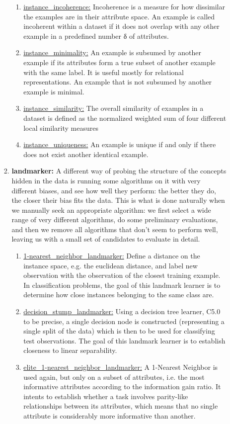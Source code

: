 \documentclass[a4paper,12pt, english]{article}
\begin{document}
\begin{enumerate}
\begin{enumerate}
\begin{enumerate}
\begin{enumerate}
				\item \underline{instance\_incoherence:} Incoherence is a measure for how dissimilar the examples are in their attribute space. An example is called incoherent within a dataset if it does not overlap with any other example in a predefined number δ of attributes.
				\item \underline{instance\_minimality:} An example is subsumed by another example if its attributes form a true subset of another example with the same label. It is useful mostly for relational representations. An example that is not subsumed by another example is minimal. 
				\item \underline{instance\_similarity:}  The overall similarity of examples in a dataset is defined as the normalized weighted sum of four different local similarity measures
				\item \underline{instance\_uniqueness:} An example is unique if and only if there does not exist another identical example.
				\end{enumerate}			
			\item \textbf{landmarker:} A different way of probing the structure of the concepts hidden in the data is running some algorithms on it with very different biases, and see how well they perform: the better they do, the closer their bias fits the data. This is what is done naturally when we manually seek an appropriate algorithm: we first select a wide range of very different algorithms, do some preliminary evaluations, and then we remove all algorithms that don’t seem to perform well, leaving us with a small set of candidates to evaluate in detail.
				\begin{enumerate}
				\item \underline{1-nearest\_neighbor\_landmarker:}  Define a distance on the instance space, e.g. the euclidean distance, and label new observation with the observation of the closest training example. In classification problems, the goal of this landmark learner is to determine how close instances belonging to the same class are.
				\item \underline{decision\_stump\_landmarker:} Using a decision tree learner, C5.0 to be precise, a single decision node is constructed (representing a single split of the data) which is then to be used for classifying test observations. The goal of this landmark learner is to establish closeness to linear separability.
				\item \underline{elite\_1-nearest\_neighbor\_landmarker:}  A 1-Nearest Neighbor is used again, but only on a subset of attributes, i.e. the most informative attributes according to the information gain ratio. It intents to establish whether a task involves parity-like relationships between its attributes, which means that no single attribute is considerably more informative than another.

\end{enumerate}
\end{enumerate}
\end{enumerate}
\end{enumerate}
\end{document}
